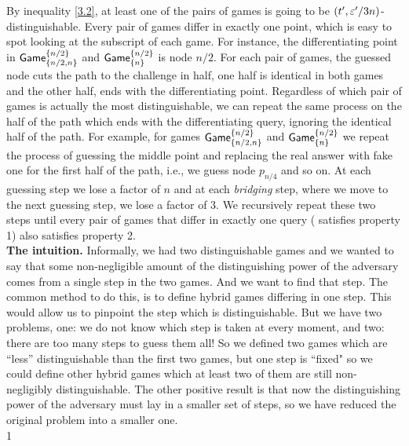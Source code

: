 \documentclass{article}
\newcommand{\game}{{\sf Game}}
\newcommand{\dgb}[2]{\game_{\cub{#1}}^{\cub{#2}}}
\def\vaa{0}
\begin{document}
By inequality \ref{3.2}, at least one of the pairs of games is going to be $(t',\varepsilon'/3n)$-distinguishable. Every pair of games differ in exactly one point, which is easy to spot looking at the subscript of each game. For instance, the differentiating point in $\dgb{n/2,n}{n/2}$ and $\dgb{n}{n/2}$ is node $n/2$. For each pair of games, the guessed node cuts the path to the challenge in half, one half is identical in both games and the other half, ends with the differentiating point. Regardless of which pair of games is actually the most distinguishable, we can repeat the same process on the half of the path which ends with the differentiating query, ignoring the identical half of the path. For example, for games $\dgb{n/2,n}{n/2}$ and $\dgb{n}{n/2}$ we repeat the process of guessing the middle point and replacing the real answer with fake one for the first half of the path, i.e., we guess node $p_{n/4}$ and so on. At each guessing step we lose a factor of $n$ and at each \textit{bridging} step, where we move to the next guessing step, we lose a factor of $3$. We recursively repeat these two steps until every pair of games that differ in exactly one query ( satisfies property 1) also satisfies property 2. \\

\noindent \textbf{The intuition.} Informally, we had two distinguishable games and we wanted to say that some non-negligible amount of the distinguishing power of the adversary comes from a single step in the two games. And we want to find that step. The common method to do this, is to define hybrid games differing in one step. This would allow us to pinpoint the step which is distinguishable. But we have two problems, one: we do not know which step is taken at every moment, and two: there are too many steps to guess them all! So we defined two games which are ``less'' distinguishable than the first two games, but one step is ``fixed" so we could define other hybrid games which at least two of them are still non-negligibly distinguishable. The other positive result is that now the distinguishing power of the adversary must lay in a smaller set of steps, so we have reduced the original problem into a smaller one. \\
\if\vaa1
\end{document}
